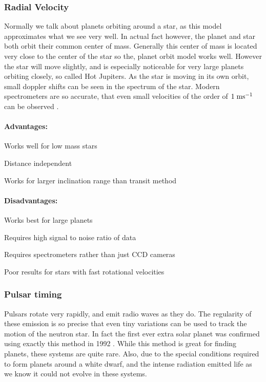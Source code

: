 \subsubsection{Radial Velocity}

Normally we talk about planets orbiting around a star, as this model approximates what we see very well. In actual fact however, the planet and star both orbit their common center of mass. Generally this center of mass is located very close to the center of the star so the, planet orbit model works well. However the star will move slightly, and is especially noticeable for very large planets orbiting closely, so called Hot Jupiters. As the star is moving in its own orbit, small doppler shifts can be seen in the spectrum of the star. Modern spectrometers are so accurate, that even small velocities of the order of $1\;\mathrm{ms^{-1}}$ can be observed \citep{ge2002externally}.

\paragraph{Advantages:}
\begin{itemize*}
    \item Works well for low mass stars
    \item Distance independent
    \item Works for larger inclination range than transit method
\end{itemize*}

\paragraph{Disadvantages:}
\begin{itemize*}
    \item Works best for large planets
    \item Requires high signal to noise ratio of data
    \item Requires spectrometers rather than just CCD cameras
    \item Poor results for stars with fast rotational velocities
\end{itemize*}

\subsubsection{Pulsar timing}

Pulsars rotate very rapidly, and emit radio waves as they do. The regularity of these emission is so precise that even tiny variations can be used to track the motion of the neutron star. In fact the first ever extra solar planet was confirmed using exactly this method in 1992 \citep{wolszczan1992planetary}. While this method is great for finding planets, these systems are quite rare. Also, due to the special conditions required to form planets around a white dwarf, and the intense radiation emitted life as we know it could not evolve in these systems.

